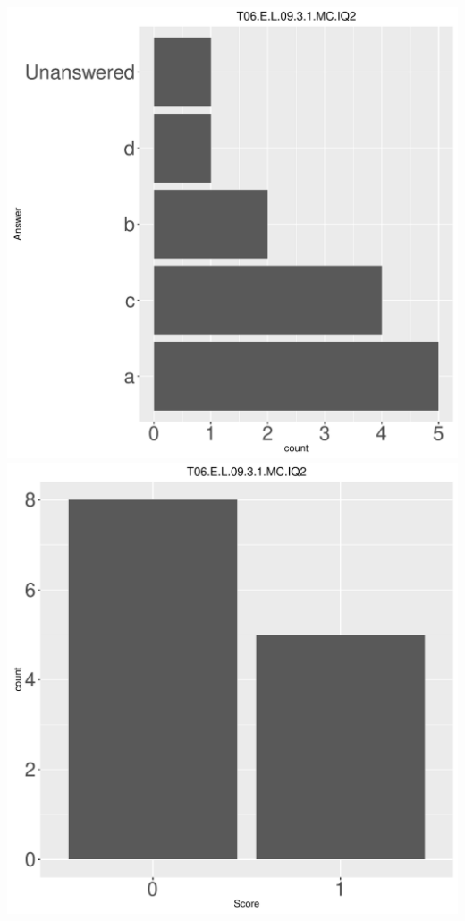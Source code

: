 \documentclass[12pt,english,nohyper]{tufte-handout}\usepackage[]{graphicx}\usepackage[]{color}
\begin{document}
\begin{center} \includegraphics[width=.45\linewidth]{Topic06_AB_43_answer} \includegraphics[width=.45\linewidth]{Topic06_AB_43_score} \end{center} 
\end{document}

